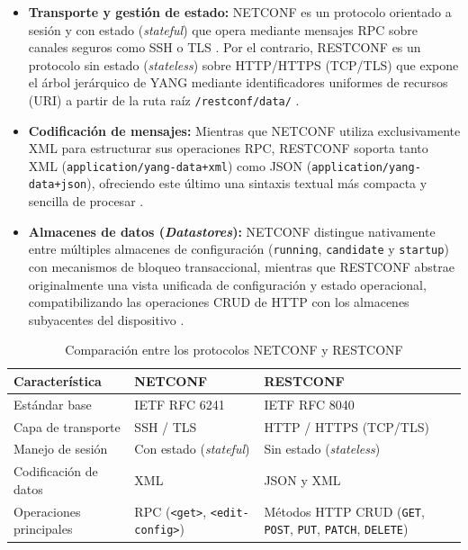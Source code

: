 \documentclass[12pt,a4paper]{article}
\begin{document}
\begin{itemize}
    \item \textbf{Transporte y gestión de estado:} NETCONF es un protocolo orientado a sesión y con estado (\textit{stateful}) que opera mediante mensajes RPC sobre canales seguros como SSH o TLS \parencite{bhat2023}. Por el contrario, RESTCONF es un protocolo sin estado (\textit{stateless}) sobre HTTP/HTTPS (TCP/TLS) que expone el árbol jerárquico de YANG mediante identificadores uniformes de recursos (URI) a partir de la ruta raíz \texttt{/restconf/data/} \parencite{cisco_restconf, granderath2023}.
    \item \textbf{Codificación de mensajes:} Mientras que NETCONF utiliza exclusivamente XML para estructurar sus operaciones RPC, RESTCONF soporta tanto XML (\texttt{application/yang-data+xml}) como JSON (\texttt{application/yang-data+json}), ofreciendo este último una sintaxis textual más compacta y sencilla de procesar \parencite{cisco_restconf, granderath2023, bhat2023}.
    \item \textbf{Almacenes de datos (\textit{Datastores}):} NETCONF distingue nativamente entre múltiples almacenes de configuración (\texttt{running}, \texttt{candidate} y \texttt{startup}) con mecanismos de bloqueo transaccional, mientras que RESTCONF abstrae originalmente una vista unificada de configuración y estado operacional, compatibilizando las operaciones CRUD de HTTP con los almacenes subyacentes del dispositivo \parencite{cisco_restconf, bhat2023}.
\end{itemize}

\begin{table}[H]
    \centering
    \caption{Comparación entre los protocolos NETCONF y RESTCONF}
    \label{tab:netconf_restconf}
    \begin{tabularx}{\textwidth}{lXX}
        \toprule
        \textbf{Característica} & \textbf{NETCONF} & \textbf{RESTCONF} \\
        \midrule
        Estándar base & IETF RFC 6241  & IETF RFC 8040 \\
        Capa de transporte & SSH / TLS  & HTTP / HTTPS (TCP/TLS) \\
        Manejo de sesión & Con estado (\textit{stateful}) & Sin estado (\textit{stateless}) \\
        Codificación de datos & XML  & JSON y XML  \\
        Operaciones principales & RPC (\texttt{<get>}, \texttt{<edit-config>})  & Métodos HTTP CRUD (\texttt{GET}, \texttt{POST}, \texttt{PUT}, \texttt{PATCH}, \texttt{DELETE}) \\
        \bottomrule
    \end{tabularx}
\end{table}
\end{document}
